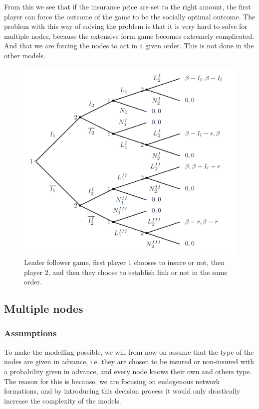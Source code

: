 From this we see that if the insurance price are set to the right amount, the first player can force the outcome of the game to be the socially optimal outcome. 
The problem with this way of solving the problem is that it is very hard to solve for  multiple nodes, because the extensive form game becomes extremely complicated. And that we are forcing the nodes to act in a given order. This is not done in the other models.
 

\begin{figure}[h]
\centering
  \includegraphics[width=0.9\linewidth]{../Figures/stackelberggame.png}
  \caption{\label{fig:stackelberg} Leader follower game, first player 1 chooses to insure or not, then player 2, and then they choose to establish link or not in the same order.}
\end{figure}


\subsection{Multiple nodes}
\subsubsection{Assumptions}
To make the modelling possible, we will from now on assume that the type of the nodes are given in advance, i.e. they are chosen to be insured or non-insured with a probability given in advance, and every node knows their own and others type. The reason for this is because, we are focusing on endogenous network formations, and by introducing this decision process it would only drastically increase the complexity of the models.

